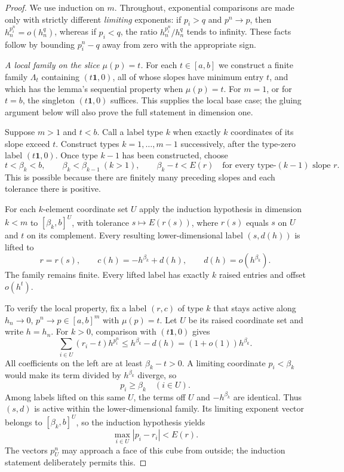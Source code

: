 \documentclass[11pt]{article}
\theoremstyle{definition}
\theoremstyle{remark}
\newcommand{\one}{\mathbf 1}
\numberwithin{equation}{section}
\begin{document}
\begin{proof}
We use induction on $m$. Throughout, exponential comparisons are
made only with strictly different \emph{limiting} exponents: if
$p_i>q$ and $p^n\to p$, then $h_n^{p_i^n}=o(h_n^q)$, whereas
if $p_i<q$, the ratio $h_n^{p_i^n}/h_n^q$ tends to infinity.
These facts follow by bounding $p_i^n-q$ away from zero with the
appropriate sign.

\medskip
\noindent\emph{A local family on the slice $\mu(p)=t$.}
For each $t\in[a,b]$ we construct a finite family $\Lambda_t$
containing $(t\one,0)$, all of whose slopes have minimum entry $t$,
and which has the lemma's sequential property when $\mu(p)=t$.
For $m=1$, or for $t=b$, the singleton $(t\one,0)$ suffices.
This supplies the local base case; the gluing argument below will
also prove the full statement in dimension one.

Suppose $m>1$ and $t<b$. Call a label type $k$ when exactly $k$
coordinates of its slope exceed $t$. Construct types
$k=1,\ldots,m-1$ successively, after the type-zero label
$(t\one,0)$. Once type $k-1$ has been constructed, choose
\begin{equation}
 t<\beta_k<b,\qquad
 \beta_k<\beta_{k-1}\ (k>1),\qquad
 \beta_k-t<E(r)\quad\text{for every type-$(k-1)$ slope }r.
 \label{eq:beta}
\end{equation}
This is possible because there are finitely many preceding slopes
and each tolerance there is positive.

For each $k$-element coordinate set $U$ apply the induction
hypothesis in dimension $k<m$ to $[\beta_k,b]^U$, with tolerance
$s\mapsto E(r(s))$, where $r(s)$ equals $s$ on $U$ and $t$ on
its complement. Every resulting lower-dimensional label
$(s,d(h))$ is lifted to
\begin{equation}
 r=r(s),\qquad c(h)=-h^{\beta_k}+d(h),\qquad d(h)=o(h^{\beta_k}).
 \label{eq:lift}
\end{equation}
The family remains finite. Every lifted label has exactly $k$
raised entries and offset $o(h^t)$.

To verify the local property, fix a label $(r,c)$ of type $k$
that stays active along $h_n\to0$, $p^n\to p\in[a,b]^m$ with
$\mu(p)=t$. Let $U$ be its raised coordinate set and write $h=h_n$.
For $k>0$, comparison with $(t\one,0)$ gives
\[
 \sum_{i\in U}(r_i-t)h^{p_i^n}
       \leq h^{\beta_k}-d(h)=(1+o(1))h^{\beta_k}.
\]
All coefficients on the left are at least $\beta_k-t>0$.
A limiting coordinate $p_i<\beta_k$ would make its term divided
by $h^{\beta_k}$ diverge, so
\begin{equation}
 p_i\geq\beta_k\quad(i\in U).
 \label{eq:raised}
\end{equation}
Among labels lifted on this same $U$, the terms off $U$ and
$-h^{\beta_k}$ are identical. Thus $(s,d)$ is active within the
lower-dimensional family. Its limiting exponent vector belongs
to $[\beta_k,b]^U$, so the induction hypothesis yields
\[
 \max_{i\in U}|p_i-r_i|<E(r).
\]
The vectors $p_U^n$ may approach a face of this cube from outside;
the induction statement deliberately permits this.


\end{proof}
\end{document}

